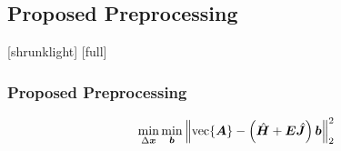 \subsection{Proposed Preprocessing}
[shrunklight]
[full]
\begin{frame}[t]
\frametitle{Proposed Preprocessing} 
	\begin{equation*}
	\min_{\Delta \bm{x}} \min_{\bm{b}} \left\lVert \operatorname{vec} \{ \bm{A} \}  - \left( \hat{\bm{H}} + \bm{E} \hat{\bm{J}} \right) \bm{b} \right\rVert_{2}^{2}
	\end{equation*}
	\begin{figure}
	\end{figure}
\end{frame}


